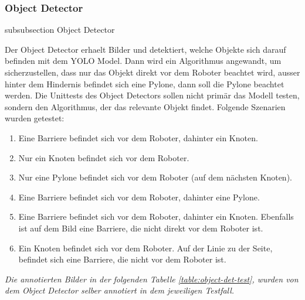 \newpage
\subsubsection*{Object Detector}\label{object-detector-unittests}
{subsubsection}
{Object Detector}

Der Object Detector erhaelt Bilder und detektiert, welche Objekte sich darauf befinden mit dem YOLO Model. Dann wird ein Algorithmus angewandt, um sicherzustellen, dass nur das Objekt direkt vor dem Roboter beachtet wird, ausser hinter dem Hindernis befindet sich eine Pylone, dann soll die Pylone beachtet werden.
Die Unittests des Object Detectors sollen nicht primär das Modell testen, sondern den Algorithmus, der das relevante Objekt findet. Folgende Szenarien wurden getestet:

\begin{enumerate}
    \item Eine Barriere befindet sich vor dem Roboter, dahinter ein Knoten.
    \item Nur ein Knoten befindet sich vor dem Roboter.
    \item Nur eine Pylone befindet sich vor dem Roboter (auf dem nächsten Knoten).
    \item Eine Barriere befindet sich vor dem Roboter, dahinter eine Pylone.
    \item Eine Barriere befindet sich vor dem Roboter, dahinter ein Knoten. Ebenfalls ist auf dem Bild eine Barriere, die nicht direkt vor dem Roboter ist.
    \item Ein Knoten befindet sich vor dem Roboter. Auf der Linie zu der Seite, befindet sich eine Barriere, die nicht vor dem Roboter ist.
\end{enumerate}

\textit{Die annotierten Bilder in der folgenden Tabelle \ref{table:object-det-test}, wurden von dem Object Detector selber annotiert in dem jeweiligen Testfall.}

